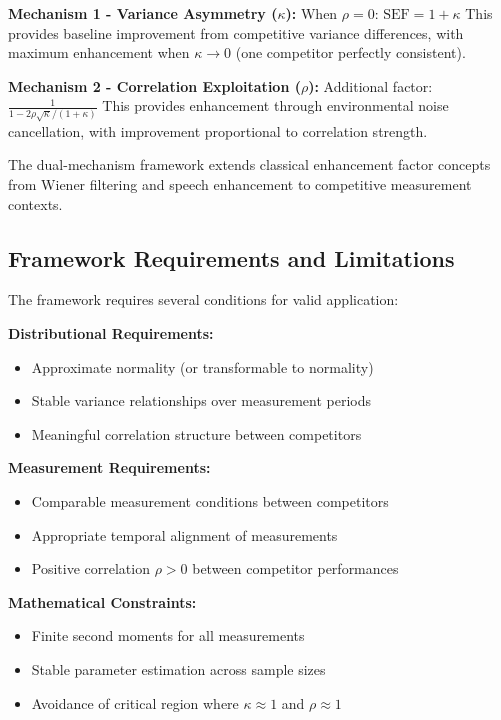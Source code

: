\textbf{Mechanism 1 - Variance Asymmetry ($\kappa$):}
When $\rho = 0$: $\text{SEF} = 1 + \kappa$
This provides baseline improvement from competitive variance differences, with maximum enhancement when $\kappa \to 0$ (one competitor perfectly consistent).

\textbf{Mechanism 2 - Correlation Exploitation ($\rho$):}
Additional factor: $\frac{1}{1 - 2\rho\sqrt{\kappa}/(1+\kappa)}$
This provides enhancement through environmental noise cancellation, with improvement proportional to correlation strength.

The dual-mechanism framework extends classical enhancement factor concepts from Wiener filtering \cite{hardie2007fast} and speech enhancement \cite{scalart1996speech} to competitive measurement contexts.

\subsection{Framework Requirements and Limitations}

The framework requires several conditions for valid application:

\textbf{Distributional Requirements:}
\begin{itemize}
    \item Approximate normality (or transformable to normality)
    \item Stable variance relationships over measurement periods
    \item Meaningful correlation structure between competitors
\end{itemize}

\textbf{Measurement Requirements:}
\begin{itemize}
    \item Comparable measurement conditions between competitors
    \item Appropriate temporal alignment of measurements
    \item Positive correlation $\rho > 0$ between competitor performances
\end{itemize}

\textbf{Mathematical Constraints:}
\begin{itemize}
    \item Finite second moments for all measurements
    \item Stable parameter estimation across sample sizes
    \item Avoidance of critical region where $\kappa \approx 1$ and $\rho \approx 1$
\end{itemize}

